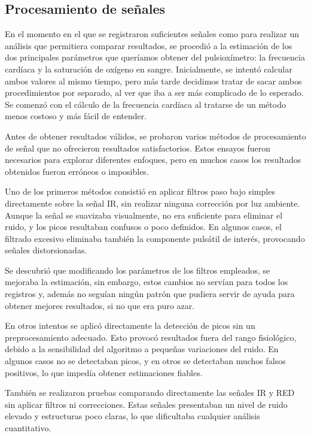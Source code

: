 \subsection{Procesamiento de señales}
En el momento en el que se registraron suficientes señales como para realizar un análisis que permitiera comparar resultados, se procedió a la estimación de los dos principales parámetros que queríamos obtener del pulsioxímetro: la frecuencia cardíaca y la saturación de oxígeno en sangre. Inicialmente, se intentó calcular ambos valores al mismo tiempo, pero más tarde decidimos tratar de sacar ambos procedimientos por separado, al ver que iba a ser más complicado de lo esperado. Se comenzó con el cálculo de la frecuencia cardíaca al tratarse de un método menos costoso y más fácil de entender.

Antes de obtener resultados válidos, se probaron varios métodos de procesamiento de señal que no ofrecieron resultados satisfactorios. Estos ensayos fueron necesarios para explorar diferentes enfoques, pero en muchos casos los resultados obtenidos fueron erróneos o imposibles.

Uno de los primeros métodos consistió en aplicar filtros paso bajo simples directamente sobre la señal IR, sin realizar ninguna corrección por luz ambiente. Aunque la señal se suavizaba visualmente, no era suficiente para eliminar el ruido, y los picos resultaban confusos o poco definidos. En algunos casos, el filtrado excesivo eliminaba también la componente pulsátil de interés, provocando señales distorsionadas.

Se descubrió que modificando los parámetros de los filtros empleados, se mejoraba la estimación, sin embargo, estos cambios no servían para todos los registros y, además no seguían ningún patrón que pudiera servir de ayuda para obtener mejores resultados, si no que era puro azar.

En otros intentos se aplicó directamente la detección de picos sin un preprocesamiento adecuado. Esto provocó resultados fuera del rango fisiológico, debido a la sensibilidad del algoritmo a pequeñas variaciones del ruido. En algunos casos no se detectaban picos, y en otros se detectaban muchos falsos positivos, lo que impedía obtener estimaciones fiables.

También se realizaron pruebas comparando directamente las señales IR y RED sin aplicar filtros ni correcciones. Estas señales presentaban un nivel de ruido elevado y estructuras poco claras, lo que dificultaba cualquier análisis cuantitativo.

